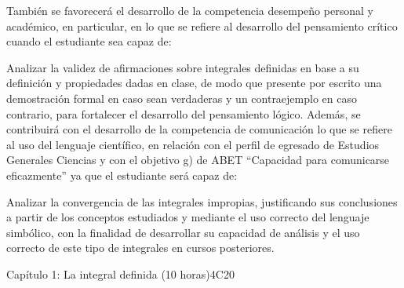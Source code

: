 \begin{syllabus}
\begin{goals}
También se favorecerá el desarrollo de la competencia desempeño personal y académico, en particular, en lo que se refiere al desarrollo del pensamiento crítico cuando el estudiante sea capaz de:
\item Analizar la validez de afirmaciones sobre integrales definidas en base a su definición y propiedades dadas en clase, de modo que presente por escrito una demostración formal en caso sean verdaderas y un contraejemplo en caso contrario, para fortalecer el desarrollo del pensamiento lógico.
Además, se contribuirá con el desarrollo de la competencia de comunicación lo que se refiere al uso del lenguaje científico, en relación con el perfil de egresado de Estudios Generales Ciencias y con el objetivo g) de ABET ``Capacidad para comunicarse eficazmente'' ya que el estudiante será capaz de:
\item Analizar la convergencia de las integrales impropias, justificando sus conclusiones a partir de los conceptos estudiados y mediante el uso correcto del lenguaje simbólico, con la finalidad de desarrollar su capacidad de análisis y el uso correcto de este tipo de integrales en cursos posteriores.
\end{goals}

\begin{outcomes}
\item {}
\item {}
\end{outcomes}

\begin{competences}
    \item {}
\end{competences}

\begin{unit}{Capítulo 1: La integral definida (10 horas)}{}{}{4}{C20}

% 


\end{unit}
\end{syllabus}
